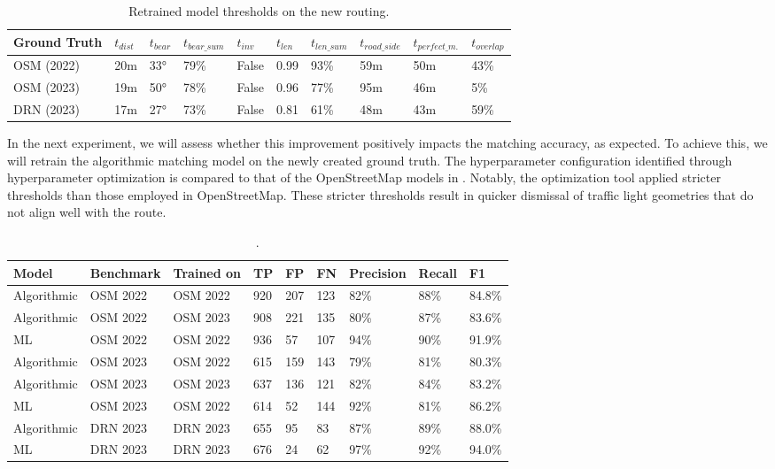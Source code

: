 \begin{table}[h]
\caption{Retrained model thresholds on the new routing.}
\begin{tabular}{@{}llllllllll@{}}
\toprule
  \textbf{Ground Truth} & $t_{dist}$ & $t_{bear}$ & $t_{bear\_sum}$ & $t_{inv}$ & $t_{len}$ & $t_{len\_sum}$ & $t_{road\_side}$ &  $t_{perfect\_m.}$ & $t_{overlap}$ \\
  \midrule
  OSM (2022) & 20m & 33° & 79\% & False & 0.99 & 93\% & 59m & 50m & 43\% \\
  OSM (2023) & 19m & 50° & 78\% & False & 0.96 & 77\% & 95m & 46m & 5\% \\
  DRN (2023) & 17m & 27° & 73\% & False & 0.81 & 61\% & 48m & 43m & 59\% \\
\bottomrule
\end{tabular}
\label{tab:hyperparameter-tuning-results-drn}
\end{table}

In the next experiment, we will assess whether this improvement positively impacts the matching accuracy, as expected. To achieve this, we will retrain the algorithmic matching model on the newly created ground truth. The hyperparameter configuration identified through hyperparameter optimization is compared to that of the OpenStreetMap models in . Notably, the optimization tool applied stricter thresholds than those employed in OpenStreetMap. These stricter thresholds result in quicker dismissal of traffic light geometries that do not align well with the route.

\begin{table}[h]
\caption{.}
\begin{tabular}{@{}lllllllll@{}}
\toprule
  \textbf{Model} & \textbf{Benchmark} & \textbf{Trained on} & \textbf{TP} & \textbf{FP} & \textbf{FN} & \textbf{Precision} & \textbf{Recall} & \textbf{F1} \\
  \midrule
  Algorithmic & OSM 2022 & OSM 2022 & 920 & 207 & 123 & 82\% & 88\% & 84.8\% \\
  Algorithmic & OSM 2022 & OSM 2023 & 908 & 221 & 135 & 80\% & 87\% & 83.6\% \\
  ML          & OSM 2022 & OSM 2022 & 936 & 57 & 107 & 94\% & 90\% & 91.9\% \\
  \midrule
  Algorithmic & OSM 2023 & OSM 2022 & 615 & 159 & 143 & 79\% & 81\% & 80.3\% \\
  Algorithmic & OSM 2023 & OSM 2023 & 637 & 136 & 121 & 82\% & 84\% & 83.2\% \\
  ML          & OSM 2023 & OSM 2022 & 614 & 52 & 144 & 92\% & 81\% & 86.2\% \\
  \midrule
  Algorithmic & DRN 2023 & DRN 2023 & 655 & 95 & 83 & 87\% & 89\% & 88.0\% \\
  ML          & DRN 2023 & DRN 2023 & 676 & 24 & 62 & 97\% & 92\% & 94.0\% \\
\bottomrule
\end{tabular}
\label{tab:model-scores-drn}
\end{table}

